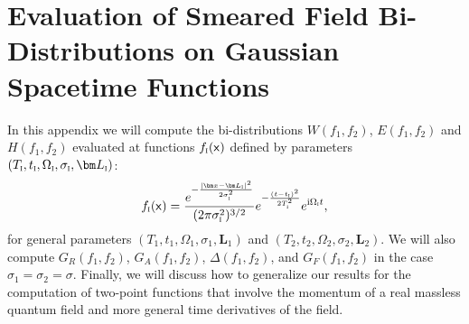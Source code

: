 \documentclass[letterpaper,12pt,titlepage,oneside,final]{book}
\newcommand{\mf}{\mathsf}%
\newcommand{\ii}{\mathrm{i}}
\newcommand{\tc}[1]{\textsc{#1}}
\begin{document}






\chapter{Evaluation of Smeared Field Bi-Distributions on Gaussian Spacetime Functions}\label{app:analytical}



In this appendix we will compute the bi-distributions $W(f_1,f_2)$, $E(f_1,f_2)$ and $H(f_1,f_2)$ evaluated at functions $f_\tc{i}(\mf x)$ defined by parameters $(T_\tc{i},t_\tc{i},\Omega_\tc{i}, \sigma_\tc{i}, \bm L_\tc{i})$:
\begin{equation}
    f_\tc{i}(\mf x) = \frac{e^{-\frac{|\bm x - \bm L_\tc{i}|^2}{2 \sigma_\tc{i}^2}}}{(2\pi \sigma_\tc{i}^2)^{3/2}}e^{- \frac{(t-t_\tc{i})^2}{2T_\tc{i}^2}}e^{\ii \Omega_\tc{i} t},
\end{equation}
for general parameters  $(T_1,t_1,\Omega_1, \sigma_1, \bm L_1)$ and $(T_2,t_2,\Omega_2, \sigma_2, \bm L_2)$. We will also compute $G_R(f_1,f_2)$, $G_A(f_1,f_2)$, $\Delta(f_1,f_2)$, and $G_F(f_1,f_2)$ in the case $\sigma_1 = \sigma_2 = \sigma$. Finally, we will discuss how to generalize our results for the computation of two-point functions that involve the momentum of a real massless quantum field and more general time derivatives of the field.
\end{document}
